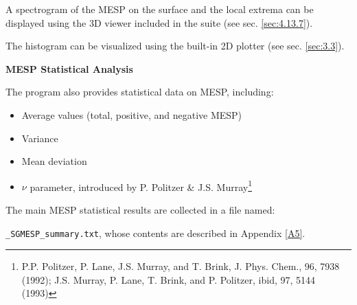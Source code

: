 \documentclass[10pt]{article}
\begin{document}
A spectrogram of the MESP on the surface and the local extrema
can be displayed using the 3D viewer included in the suite (see sec. \ref{sec:4.13.7}).

The histogram can be visualized using the built-in 2D plotter (see sec. \ref{sec:3.3}).

\vspace*{3mm}
{\bf MESP Statistical Analysis}
\vspace*{3mm}

The program also provides statistical data on MESP, including:

\begin{itemize}
\item Average values (total, positive, and negative MESP)
\item Variance
\item Mean deviation
\item $\nu$ parameter, introduced by P. Politzer \& J.S. Murray\footnote{P.P. Politzer, P. Lane, J.S. Murray, and T. Brink, J. Phys. Chem., 96, 7938 (1992);
J.S. Murray, P. Lane, T. Brink, and P. Politzer, ibid, 97, 5144 (1993)}
\end{itemize}

The main MESP statistical results are collected in a file named:

\texttt{\_SGMESP\_summary.txt}, whose contents are described in Appendix \ref{A5}.
\end{document}
